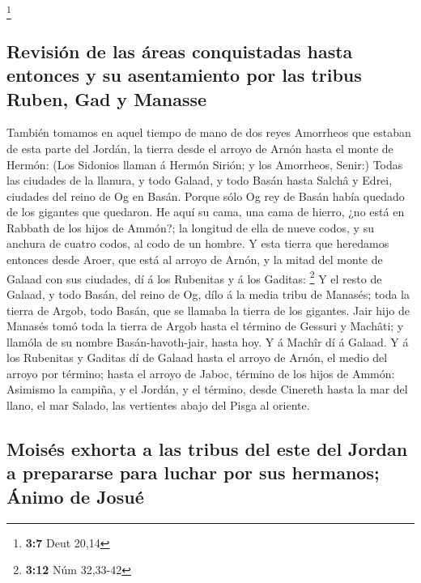\footnote{\textbf{3:7} Deut 20,14}

\hypertarget{revisiuxf3n-de-las-uxe1reas-conquistadas-hasta-entonces-y-su-asentamiento-por-las-tribus-ruben-gad-y-manasse}{%
\subsection{Revisión de las áreas conquistadas hasta entonces y su
asentamiento por las tribus Ruben, Gad y
Manasse}\label{revisiuxf3n-de-las-uxe1reas-conquistadas-hasta-entonces-y-su-asentamiento-por-las-tribus-ruben-gad-y-manasse}}

 También tomamos en aquel tiempo de mano de dos reyes
Amorrheos que estaban de esta parte del Jordán, la tierra desde el
arroyo de Arnón hasta el monte de Hermón:  (Los Sidonios
llaman á Hermón Sirión; y los Amorrheos, Senir:)  Todas
las ciudades de la llanura, y todo Galaad, y todo Basán hasta Salchâ y
Edrei, ciudades del reino de Og en Basán.  Porque sólo Og
rey de Basán había quedado de los gigantes que quedaron. He aquí su
cama, una cama de hierro, ¿no está en Rabbath de los hijos de Ammón?; la
longitud de ella de nueve codos, y su anchura de cuatro codos, al codo
de un hombre.  Y esta tierra que heredamos entonces desde
Aroer, que está al arroyo de Arnón, y la mitad del monte de Galaad con
sus ciudades, dí á los Rubenitas y á los Gaditas: \footnote{\textbf{3:12}
  Núm 32,33-42}  Y el resto de Galaad, y todo Basán, del
reino de Og, dílo á la media tribu de Manasés; toda la tierra de Argob,
todo Basán, que se llamaba la tierra de los gigantes. 
Jair hijo de Manasés tomó toda la tierra de Argob hasta el término de
Gessuri y Machâti; y llamóla de su nombre Basán-havoth-jair, hasta hoy.
 Y á Machîr dí á Galaad.  Y á los
Rubenitas y Gaditas dí de Galaad hasta el arroyo de Arnón, el medio del
arroyo por término; hasta el arroyo de Jaboc, término de los hijos de
Ammón:  Asimismo la campiña, y el Jordán, y el término,
desde Cinereth hasta la mar del llano, el mar Salado, las vertientes
abajo del Pisga al oriente.

\hypertarget{moisuxe9s-exhorta-a-las-tribus-del-este-del-jordan-a-prepararse-para-luchar-por-sus-hermanos-uxe1nimo-de-josuuxe9}{%
\subsection{Moisés exhorta a las tribus del este del Jordan a prepararse
para luchar por sus hermanos; Ánimo de
Josué}\label{moisuxe9s-exhorta-a-las-tribus-del-este-del-jordan-a-prepararse-para-luchar-por-sus-hermanos-uxe1nimo-de-josuuxe9}}

